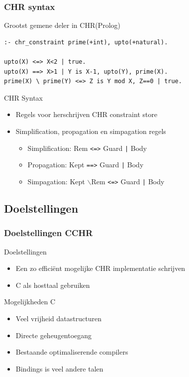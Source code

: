 \documentclass{beamer}
\newcommand{\bs}{$\backslash$}
\newcommand{\code}[1]{{\tt #1}}
\begin{document}
\begin{frame}[containsverbatim]
  \frametitle{CHR syntax}
  \begin{example}{Grootst gemene deler in CHR(Prolog)}
\begin{Verbatim}
:- chr_constraint prime(+int), upto(+natural).

upto(X) <=> X<2 | true.
upto(X) ==> X>1 | Y is X-1, upto(Y), prime(X).
prime(X) \ prime(Y) <=> Z is Y mod X, Z==0 | true.
\end{Verbatim}
  \end{example}

  \begin{block}{CHR Syntax}
    \begin{itemize}
      \item Regels voor herschrijven CHR constraint store
      \item Simplification, propagation en simpagation regels \begin{itemize}
        \item Simplification: {Rem} \code{<=>} {Guard} \code{|} {Body}
        \item Propagation: {Kept} \code{==>} {Guard} \code{|} {Body}
        \item Simpagation: {Kept} \bs {Rem} \code{<=>} {Guard} \code{|} {Body}
      \end{itemize}
    \end{itemize}
  \end{block}
\end{frame}

\subsection{Doelstellingen}

\begin{frame}
  \frametitle{Doelstellingen CCHR}
  \begin{block}{Doelstellingen}
    \begin{itemize}
      \item Een zo effici\"ent mogelijke CHR implementatie schrijven
      \item C als hosttaal gebruiken
    \end{itemize}
  \end{block}

  \begin{block}{Mogelijkheden C}
    \begin{itemize}
      \item Veel vrijheid datastructuren
      \item Directe geheugentoegang
      \item Bestaande optimaliserende compilers
      \item Bindings is veel andere talen
    \end{itemize}
  \end{block}

\end{frame}
\end{document}
